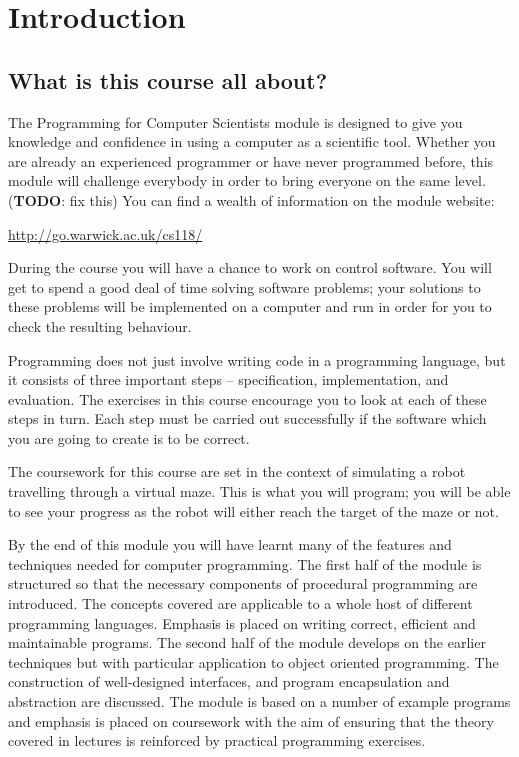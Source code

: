 \section{Introduction}

\subsection{What is this course all about?}

The Programming for Computer Scientists module is designed to give you knowledge and confidence in using a computer as a scientific tool. Whether you are already an experienced programmer or have never programmed before, this module will challenge everybody in order to bring everyone on the same level. (\textbf{TODO}: fix this) You can find a wealth of information on the module website:
\begin{center}
	\url{http://go.warwick.ac.uk/cs118/}
\end{center}

During the course you will have a chance to work on control software. 
You will get to spend a good deal of time solving software problems; your
solutions to these problems will be implemented on a computer and run in
order for you to check the resulting behaviour. 

Programming does not just involve writing code in a programming language, but it consists of three important steps -- specification, implementation, and evaluation. The exercises in 
this course encourage you to look at each of these steps in turn. Each step 
must be carried out successfully if the software which you are going to 
create is to be correct. 
 
The coursework for this course are set in the context of simulating a robot travelling through a virtual maze. This is what you will program; you will be able to see your progress as the robot will either reach the target of the maze or not. 
 
By the end of this module you will have learnt many of the features and techniques needed for computer programming. The first half of the module is structured so that the necessary components of procedural programming are introduced. The concepts covered are applicable to a whole host of different programming languages. Emphasis is placed on writing correct, efficient and maintainable programs. The second half of the module develops on the earlier techniques but with particular application to object oriented programming. The construction of well-designed interfaces, and program encapsulation and abstraction are discussed. The module is based on a number of example programs and emphasis is placed on coursework with the aim of ensuring that the theory covered in lectures is reinforced by practical programming exercises. 

